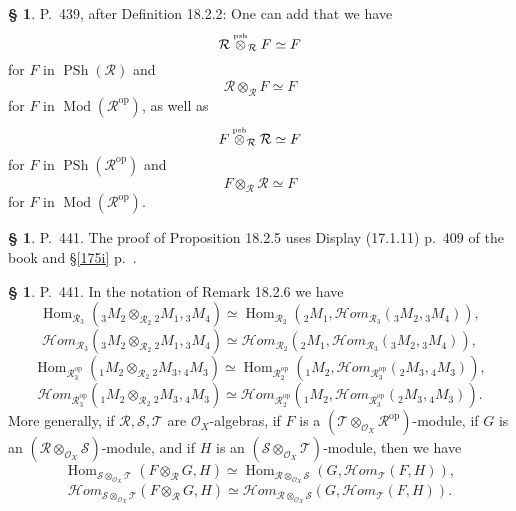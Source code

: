\documentclass[12pt]{article}
\theoremstyle{remark}
\theoremstyle{definition}
\newtheorem{s}[thm]{\S}
\newcommand{\cc}{\mathcal}
\newcommand{\oo}{\operatorname}
\newcommand{\HOM}{\cc H\!\mathit{om}}
\DeclareMathOperator{\Hom}{Hom}
\DeclareMathOperator{\Mod}{Mod}
\DeclareMathOperator{\op}{op}
\begin{document}
\begin{s}\label{neutral}
P.~439, after Definition 18.2.2: One can add that we have 
$$
\cc R\overset{\text{\tiny psh}}{\otimes}_{\cc R}F\simeq F
$$ 
for $F$ in $\oo{PSh}(\cc R)$ and 
$$
\cc R\otimes_{\cc R}F\simeq F
$$ 
for $F$ in $\Mod(\cc R^{\op})$, as well as 
$$F\overset{\text{\tiny psh}}{\otimes}_{\cc R}\cc R\simeq F
$$ 
for $F$ in $\oo{PSh}(\cc R^{\op})$ and 
$$
F\otimes_{\cc R}\cc R\simeq F
$$ 
for $F$ in $\Mod(\cc R^{\op})$. 
\end{s} 

% 

\begin{s}
P.~441. The proof of Proposition 18.2.5 uses Display (17.1.11) p.~409 of the book and \S\ref{175i} p.~\pageref{175i}. 
\end{s} 

% 

\begin{s} 
P.~441. In the notation of Remark 18.2.6 we have 
$$
\Hom_{\cc R_3}({}_3M_2\otimes_{\cc R_2}{}_2M_1,{}_3M_4)\simeq
\Hom_{\cc R_2}({}_2M_1,\HOM_{\cc R_3}({}_3M_2,{}_3M_4)),
$$
$$
\HOM_{\cc R_3}({}_3M_2\otimes_{\cc R_2}{}_2M_1,{}_3M_4)\simeq
\HOM_{\cc R_2}({}_2M_1,\HOM_{\cc R_3}({}_3M_2,{}_3M_4)),
$$ 
$$
\Hom_{\cc R_3^{\op}}({}_1M_2\otimes_{\cc R_2}{}_2M_3,{}_4M_3)\simeq
\Hom_{\cc R_2^{\op}}({}_1M_2,\HOM_{\cc R_3^{\op}}({}_2M_3,{}_4M_3)),
$$ 
$$
\HOM_{\cc R_3^{\op}}({}_1M_2\otimes_{\cc R_2}{}_2M_3,{}_4M_3)\simeq
\HOM_{\cc R_2^{\op}}({}_1M_2,\HOM_{\cc R_3^{\op}}({}_2M_3,{}_4M_3)).
$$ 
More generally, if $\cc{R,S,T}$ are $\cc O_X$-algebras, if $F$ is a $(\cc T\otimes_{\cc O_X}\cc R^{\op})$-module, if $G$ is an $(\cc R\otimes_{\cc O_X}\cc S)$-module, and if $H$ is an $(\cc S\otimes_{\cc O_X}\cc T)$-module, then we have 
$$ 
\Hom_{\cc S\otimes_{\cc O_X}\cc T}(F\otimes_{\cc R}G,H)\simeq
\Hom_{\cc R\otimes_{\cc O_X}\cc S}(G,\HOM_{\cc T}(F,H)), 
$$ 
\begin{equation}\label{HOM}
\HOM_{\cc S\otimes_{\cc O_X}\cc T}(F\otimes_{\cc R}G,H)\simeq
\HOM_{\cc R\otimes_{\cc O_X}\cc S}(G,\HOM_{\cc T}(F,H)). 
\end{equation}
\end{s} 

%
\end{document}

